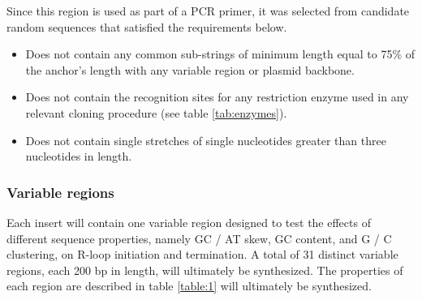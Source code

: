 \documentclass[11pt]{article}
\begin{document}
Since this region is used as part of a PCR primer, it was selected from candidate random sequences that satisfied the requirements below.

\begin{itemize}
	\item Does not contain any common sub-strings of minimum length equal to 75\% of the anchor's length with any variable region or plasmid backbone.
	\item Does not contain the recognition sites for any restriction enzyme used in any relevant cloning procedure (see table \ref{tab:enzymes}).
	\item Does not contain single stretches of single nucleotides greater than three nucleotides in length.
\end{itemize}


\subsubsection{Variable regions}

Each insert will contain one variable region designed to test the effects of different sequence properties, namely GC / AT skew, GC content, and G / C clustering, on R-loop initiation and termination.  A total of 31 distinct variable regions, each 200 bp in length, will ultimately be synthesized. The properties of each region are described in table \ref{table:1} will ultimately be synthesized. 
\end{document}
